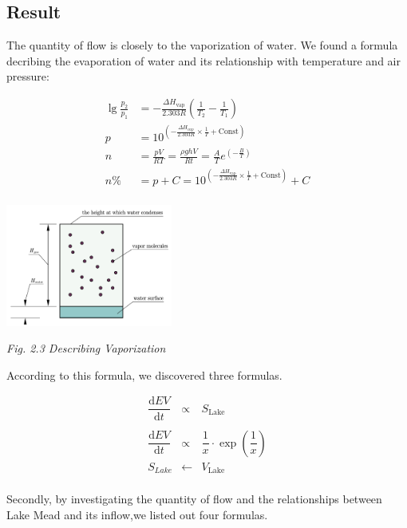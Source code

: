 \documentclass[12pt]{article}
\theoremstyle{definition}
\theoremstyle{remark}
\numberwithin{equation}{section}
\begin{document}
	\subsection{Result}
		The quantity of flow is closely to the vaporization of water. We found a formula decribing the evaporation of water and its relationship with temperature and air pressure: \cite{Vapor Pressure}
		
		\begin{align*}
			\lg\frac{p_2}{p_1}&=-\frac{\Delta H_\text{vap}}{2.303R} \left(\frac{1}{T_2}-\frac{1}{T_1}\right)\\
			p&=10^{\left(-\frac{\Delta H_{vap}}{2.303R}\times\frac{1}{T}+\text{Const}\right)}\\
			n&=\frac{pV}{RT}=\frac{\rho ghV}{Rt}=\frac{A}{T} e^{\left(-\frac{B}{T}\right)}\\
			n\%&=p+C=10^{\left(-\frac{\Delta H_{\text{vap}}}{2.303R}\times\frac{1}{T}+\text{Const}\right)}+C\\
		\end{align*}
	
		\begin{center}
			\includegraphics[height=4cm]{2.3 Describing Vaporization.jpg}
			
			\small{\textit{Fig. 2.3 Describing Vaporization}}
		\end{center}
		
		According to this formula, we discovered three formulas.
		
		$$\begin{array}{rcl}
			\dfrac{\mathrm{d}EV}{\mathrm{d}t}&\propto&S_{\text{Lake}}\\\\
			\dfrac{\mathrm{d}EV}{\mathrm{d}t}&\propto&\dfrac{1}{x}\cdot\exp\left(\dfrac{1}{x} \right)\\
			S_{Lake}&\leftarrow& V_{\text{Lake}}\\	
		\end{array}$$
		
		Secondly, by investigating the quantity of flow and the relationships between Lake Mead and its inflow,we listed out four formulas.
		
\end{document}
